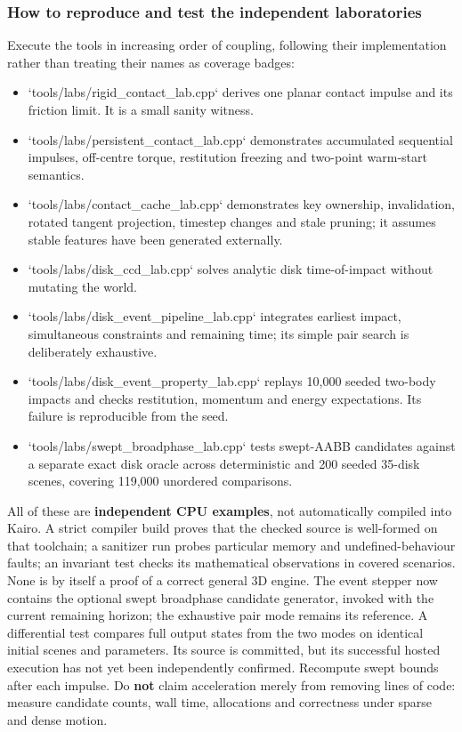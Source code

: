 \subsubsection{How to reproduce and test the independent laboratories}\label{06-engine-ii-ch046-how-to-reproduce-and-test-the-independent-laboratories}

\hypertarget{06-engine-ii-ch046-how-to-reproduce-and-test-the-independent-laboratories}{}

Execute the tools in increasing order of coupling, following their implementation rather than treating their names as coverage badges:

\begin{itemize}
\tightlist
\item
  `tools/labs/rigid\_contact\_lab.cpp` derives one planar contact impulse and its friction limit. It is a small sanity witness.
\item
  `tools/labs/persistent\_contact\_lab.cpp` demonstrates accumulated sequential impulses, off-centre torque, restitution freezing and two-point warm-start semantics.
\item
  `tools/labs/contact\_cache\_lab.cpp` demonstrates key ownership, invalidation, rotated tangent projection, timestep changes and stale pruning; it assumes stable features have been generated externally.
\item
  `tools/labs/disk\_ccd\_lab.cpp` solves analytic disk time-of-impact without mutating the world.
\item
  `tools/labs/disk\_event\_pipeline\_lab.cpp` integrates earliest impact, simultaneous constraints and remaining time; its simple pair search is deliberately exhaustive.
\item
  `tools/labs/disk\_event\_property\_lab.cpp` replays 10,000 seeded two-body impacts and checks restitution, momentum and energy expectations. Its failure is reproducible from the seed.
\item
  `tools/labs/swept\_broadphase\_lab.cpp` tests swept-AABB candidates against a separate exact disk oracle across deterministic and 200 seeded 35-disk scenes, covering 119,000 unordered comparisons.
\end{itemize}

All of these are \textbf{independent CPU examples}, not automatically compiled into Kairo. A strict compiler build proves that the checked source is well-formed on that toolchain; a sanitizer run probes particular memory and undefined-behaviour faults; an invariant test checks its mathematical observations in covered scenarios. None is by itself a proof of a correct general 3D engine. The event stepper now contains the optional swept broadphase candidate generator, invoked with the current remaining horizon; the exhaustive pair mode remains its reference. A differential test compares full output states from the two modes on identical initial scenes and parameters. Its source is committed, but its successful hosted execution has not yet been independently confirmed. Recompute swept bounds after each impulse. Do \textbf{not} claim acceleration merely from removing lines of code: measure candidate counts, wall time, allocations and correctness under sparse and dense motion.

